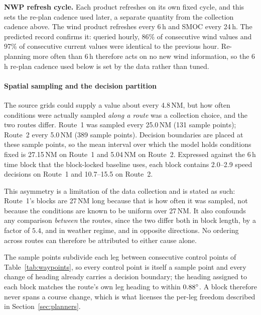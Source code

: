 \documentclass[review,authoryear]{elsarticle}
\begin{document}
\noindent\textbf{NWP refresh cycle.} Each product refreshes on its own fixed cycle, and this sets the
re-plan cadence used later, a separate quantity from the collection cadence above. The wind
product refreshes every 6\,h and SMOC every 24\,h. The predicted record confirms it: queried hourly,
86\% of consecutive wind values and 97\% of consecutive current values were identical to the previous
hour. Re-planning more often than 6\,h therefore acts on no new wind information, so the 6\,h re-plan
cadence used below is set by the data rather than tuned.

\paragraph{Spatial sampling and the decision partition}
\label{sec:sampling}
The source grids could supply a value about every 4.8\,NM, but how often conditions were actually
sampled \emph{along a route} was a collection choice, and the two routes differ. Route~1 was sampled
every 25.0\,NM (131 sample points); Route~2 every 5.0\,NM (389 sample points). Decision boundaries are
placed at these sample points, so the mean interval over which the model holds conditions fixed is
27.15\,NM on Route~1 and 5.04\,NM on Route~2. Expressed against the 6\,h time block that the
block-locked baseline uses, each block contains 2.0--2.9 speed decisions on Route~1 and 10.7--15.5 on
Route~2.

This asymmetry is a limitation of the data collection and is stated as such: Route~1's blocks are
27\,NM long because that is how often it was sampled, not because the conditions are known to be
uniform over 27\,NM. It also confounds any comparison \emph{between} the routes, since the two differ
both in block length, by a factor of $5.4$, and in weather regime, and in opposite directions. No
ordering across routes can therefore be attributed to either cause alone.

The sample points subdivide each leg between consecutive control points of Table~\ref{tab:waypoints},
so every control point is itself a sample point and every change of heading already carries a decision
boundary; the heading assigned to each block matches the route's own leg heading to within
$0.88\degree$. A block therefore never spans a course change, which is what licenses the per-leg
freedom described in Section~\ref{sec:planners}.
\end{document}
